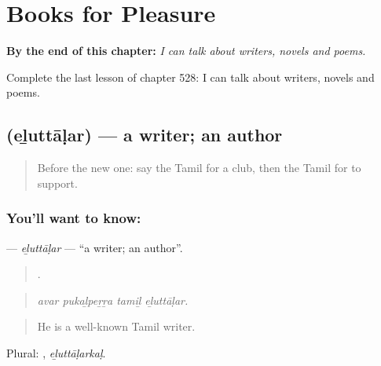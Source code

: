 
\chapter{Books for Pleasure}
\label{ch:ta-books-for-pleasure}

\begin{chapteropening}
\textbf{By the end of this chapter:} \emph{I can talk about writers, novels and poems.}

Complete the last lesson of chapter 528: I can talk about writers, novels and poems.
\end{chapteropening}

\section[\texorpdfstring{\ta{எழுத்தாளர்} (eḻuttāḷar)}{எழுத்தாளர் (eḻuttāḷar)}]{ (eḻuttāḷar) — a writer; an author}

\label{lesson:TA-C528-eluttalar}



\begin{quote}
Before the new one: say the Tamil for a club, then the Tamil for to support.
\end{quote}

\subsection*{You'll want to know: }
\textbf{} — \emph{eḻuttāḷar} — \textquotedblleft{}a writer; an author\textquotedblright{}.

\begin{quote}
   .
\end{quote}

\begin{quote}
\emph{avar pukaḻpeṟṟa tamiḻ eḻuttāḷar.}
\end{quote}

\begin{quote}
He is a well-known Tamil writer.
\end{quote}

Plural: , \emph{eḻuttāḷarkaḷ}.

